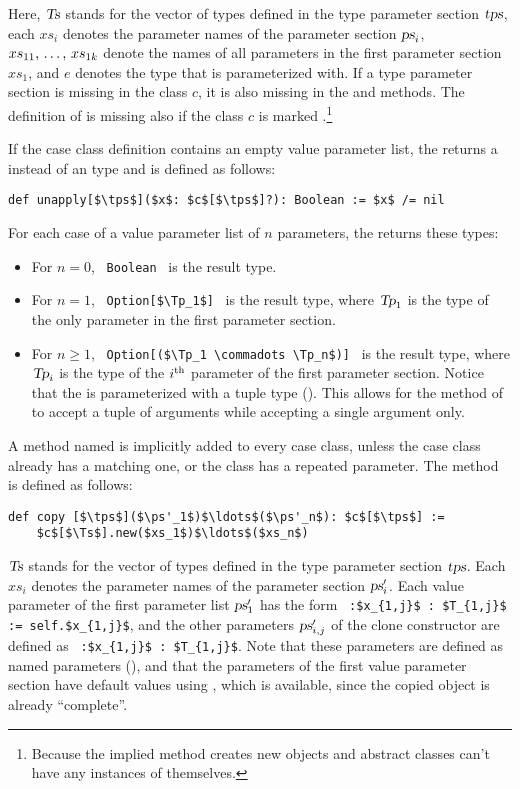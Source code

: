 Here, $\mbox{\sl Ts}$ stands for the vector of types defined in the type parameter section $\mbox{\sl tps}$, each $xs_i$ denotes the parameter names of the parameter section $\mbox{\sl ps}_i$, $xs_{11} ,\, \ldots ,\, xs_{1k}$ denote the names of all parameters in the first parameter section $xs_1$, and $e$ denotes the type that  is parameterized with. If a type parameter section is missing in the class $c$, it is also missing in the  and  methods. The definition of  is missing also if the class $c$ is marked .\footnote{Because the implied  method creates new objects and abstract classes can't have any instances of themselves.}

If the case class definition contains an empty value parameter list, the  returns a  instead of an  type and is defined as follows:
\begin{lstlisting}
def unapply[$\tps$]($x$: $c$[$\tps$]?): Boolean := $x$ /= nil
\end{lstlisting}

For each case of a value parameter list of $n$ parameters, the  returns these types: 
\begin{itemize}
\item
For $n = 0$, ~\lstinline!Boolean!~ is the result type. 

\item
For $n = 1$, ~\lstinline!Option[$\Tp_1$]!~ is the result type, where $\mbox{\sl Tp}_1$ is the type of the only parameter in the first parameter section. 

\item
For $n \geq 1$, ~\lstinline!Option[($\Tp_1 \commadots \Tp_n$)]!~ is the result type, where $\mbox{\sl Tp}_i$ is the type of the $i^{\mbox{\scriptsize th}}$ parameter of the first parameter section. Notice that the  is parameterized with a tuple type (). This allows for the  method of  to accept a tuple of arguments while accepting a single argument only. 
\end{itemize}

A method named  is implicitly added to every case class, unless the case class already has a matching one, or the class has a repeated parameter. The method is defined as follows:
\begin{lstlisting}
def copy [$\tps$]($\ps'_1$)$\ldots$($\ps'_n$): $c$[$\tps$] :=
    $c$[$\Ts$].new($xs_1$)$\ldots$($xs_n$)
\end{lstlisting}
$\mbox{\sl Ts}$ stands for the vector of types defined in the type parameter section $\mbox{\sl tps}$. Each $xs_i$ denotes the parameter names of the parameter section $\mbox{\sl ps}'_i$.  Each value parameter of the first parameter list $\mbox{\sl ps}'_1$ has the form ~\lstinline!:$x_{1,j}$ : $T_{1,j}$ := self.$x_{1,j}$!, and the other parameters $\mbox{\sl ps}'_{i,j}$ of the clone constructor are defined as ~\lstinline!:$x_{1,j}$ : $T_{1,j}$!. Note that these parameters are defined as named parameters (), and that the parameters of the first value parameter section have default values using , which is available, since the copied object is already ``complete''. 

